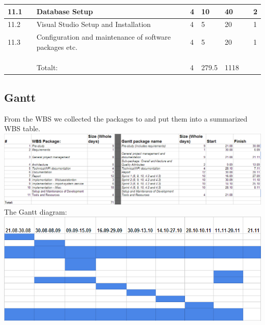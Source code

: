 \begin{longtable}{|p{0.7cm}|p{3cm}|p{2cm}|p{2cm}|p{2cm}|p{2cm}|p{2cm}|p{2cm}|}
\hline
11.1 &  & Database Setup & 4 & 10 & 40 &  & 2\\ 
\hline
11.2 &  & Visual Studio Setup and Installation & 4 & 5 & 20 &  & 1\\ 
\hline
11.3 &  & Configuration and maintenance of software packages etc. & 4 & 5 & 20 &  & 1\\ 
\hline
 &  &  &  &  &  &  & \\ 
\hline
 &  &  &  &  &  &  & \\ 
\hline
 &  &  &  &  &  &  & \\ 
\hline
 &  & Totalt: & 4 & 279.5 & 1118 &  & \\
\hline %

\end{longtable}
\subsection{Gantt}
From the WBS we collected the packages to and put them into a summarized WBS table.
\hspace{-1.7cm}\includegraphics[width=1.3\textwidth]{images/gantt01.png}\\
The Gantt diagram:
\includegraphics[width=1\textwidth]{images/gantt02.png}


